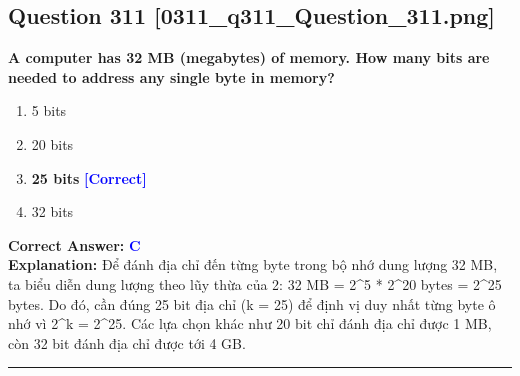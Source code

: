\documentclass[11pt,a4paper]{article}
\begin{document}
\begin{minipage}{\textwidth}
\subsection*{Question 311 \quad \footnotesize{[0311\_q311\_Question\_311.png]}}
\noindent \textbf{A computer has 32 MB (megabytes) of memory. How many bits are needed to address any single byte in memory?}

\begin{enumerate}[label=\Alph*.]
    \item 5 bits
    \item 20 bits
    \item \textbf{25 bits} \hfill \textcolor{blue}{\textbf{[Correct]}}
    \item 32 bits
\end{enumerate}

\noindent \textbf{Correct Answer:} \textcolor{blue}{\textbf{C}} \\[2pt]
\noindent \textbf{Explanation:} Để đánh địa chỉ đến từng byte trong bộ nhớ dung lượng 32 MB, ta biểu diễn dung lượng theo lũy thừa của 2: 32 MB = 2\textasciicircum{}5 * 2\textasciicircum{}20 bytes = 2\textasciicircum{}25 bytes. Do đó, cần đúng 25 bit địa chỉ (k = 25) để định vị duy nhất từng byte ô nhớ vì 2\textasciicircum{}k = 2\textasciicircum{}25. Các lựa chọn khác như 20 bit chỉ đánh địa chỉ được 1 MB, còn 32 bit đánh địa chỉ được tới 4 GB.

\par\vspace{0.3cm}
\hrule
\vspace{0.3cm}
\end{minipage}
\end{document}
